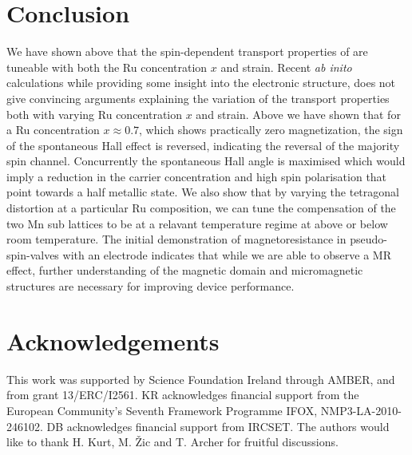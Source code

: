 \documentclass[reprint,aip,apl,floatfix,linenumbers,superscriptaddress]{revtex4-1}
\begin{document}
\section{Conclusion}
\label{sec:conclusion}
We have shown above that the spin-dependent transport properties of  are tuneable with both the Ru concentration $x$ and strain. Recent 
\textit{ab inito} calculations \cite{galanakisJAP2013} while providing some 
insight into the electronic structure, does not give convincing arguments 
explaining the variation of the transport properties both with varying Ru 
concentration $x$ and strain. Above we have shown that for a Ru concentration 
$x\approx\num{0.7}$, which shows practically zero magnetization, the sign of 
the spontaneous Hall effect is reversed, indicating the reversal of the 
majority spin channel. Concurrently the spontaneous Hall angle is maximised 
which would imply a reduction in the carrier concentration and high spin 
polarisation that point towards a half metallic state. We also show that by 
varying the tetragonal distortion at a particular Ru composition, we can tune 
the compensation of the two Mn sub lattices to be at a relavant temperature 
regime at above or below room temperature. 
The initial demonstration of magnetoresistance in pseudo-spin-valves with an 
 electrode indicates that while we are able to observe a MR effect, 
further understanding of the magnetic domain and micromagnetic structures are 
necessary for improving device performance. 
 
\section{Acknowledgements}
\label{sec:acknowledgements}
This work was supported by Science Foundation Ireland through AMBER, and from 
grant 13/ERC/I2561. KR acknowledges financial support from the
European Community's Seventh Framework Programme IFOX, NMP3-LA-2010-246102. 
DB acknowledges financial support from IRCSET. The authors would like to 
thank H. Kurt, M. \v{Z}ic and T. Archer for fruitful discussions.


\end{document}
